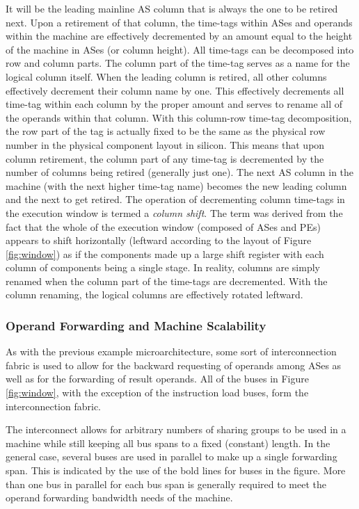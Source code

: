 \documentclass{book}
\begin{document}
It will be the leading mainline AS column that is always the one
to be retired next.
Upon a retirement of that column, the time-tags within ASes and
operands within the machine are effectively decremented by an amount equal
to the height of the machine in ASes (or column height).
All time-tags can be decomposed into row and 
column parts.  The column part of the time-tag serves as a name
for the logical column itself.
When the leading column is retired, all other columns effectively
decrement their column name by one.  This effectively decrements
all time-tag within each column by the proper amount and
serves to rename
all of the operands within that column.
With this column-row time-tag decomposition, the row part of the tag
is actually fixed to be the same as the physical row number in
the physical component layout in silicon.
This means that upon column retirement, the column part of any
time-tag is decremented by the number of columns being retired
(generally just one).
The next AS column in the machine (with the next higher time-tag name)
becomes the new leading column and the next to get retired.
The operation of decrementing column time-tags 
in the execution window is termed a \textit{column shift}.
The term was derived from the fact that the whole of the execution
window
(composed of ASes and PEs)
appears to shift horizontally (leftward according to the layout of Figure
\ref{fig:window}) as if the components made up a large shift register
with each column of components being a single stage.  In reality, 
columns are simply renamed when the column part of the time-tags
are decremented.  With the column renaming, the logical columns
are effectively rotated leftward.
%
%
\subsubsection{Operand Forwarding and Machine Scalability}
%
As with the previous example microarchitecture, some sort
of interconnection fabric is used to allow for the
backward requesting of operands among ASes as well
as for the forwarding of result operands.
All of the buses in
Figure \ref{fig:window}, with the exception of the instruction
load buses, form the interconnection fabric.

The interconnect allows for arbitrary numbers of sharing
groups to be used in a machine while still keeping all bus
spans to a fixed (constant) length.
In the general case, several buses are used in parallel to make up
a single forwarding span.
This is indicated by the use of the
bold lines for buses in the figure.
More than one
bus in parallel for each bus span is generally required to meet
the operand forwarding bandwidth needs of the machine.
\end{document}

